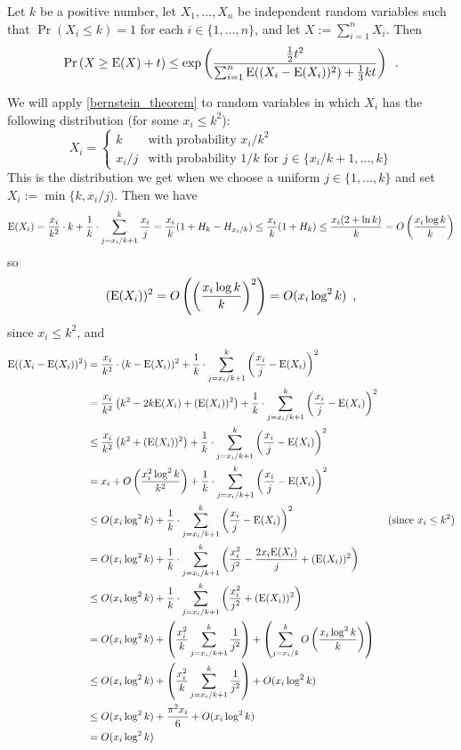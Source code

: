 \documentclass{patmorin}
\begin{document}
\begin{thm}\label{bernstein_theorem}
  Let $k$ be a positive number, let $X_1,\ldots,X_n$ be independent random variables such that $\Pr(X_i\le k)=1$ for each $i\in\{1,\ldots,n\}$, and let $X:=\sum_{i=1}^n X_i$. Then
  \begin{equation}
    \Pr\left(X \ge \mathrm{E}(X)+ t\right)
      \le \exp\left(\frac{\tfrac{1}{2}t^2}{\sum_{i=1}^n \mathrm{E}((X_i-\mathrm{E}(X_i))^2)+\tfrac{1}{3}kt}\right) \enspace . \label{bernstein}
  \end{equation}
\end{thm}
We will apply \cref{bernstein_theorem} to random variables in which $X_i$ has the following distribution (for some $x_i\le k^2$):
\[
  X_i = \begin{cases}
          k & \text{with probability $x_i/k^2$} \\
          x_i/j & \text{with probability $1/k$ for $j\in\{x_i/k+1,\ldots,k\}$}
        \end{cases}
\]
This is the distribution we get when we choose a uniform $j\in\{1,\ldots,k\}$ and set $X_i:=\min\{k,x_i/j)$.
Then we have
\[
  \mathrm{E}(X_i)=\frac{x_i}{k^2}\cdot k + \frac{1}{k}\cdot\sum_{j=x_i/k+1}^k \frac{x_i}{j}
  = \frac{x_i}{k}(1+H_{k}-H_{x_i/k})
  \le \frac{x_i}{k}(1+H_{k})
  \le \frac{x_i(2+\ln k)}{k}
  = O\left(\frac{x_i\log k}{k}\right)
\]
so
\[
  (\mathrm{E}(X_i))^2 = O\left(\left(\frac{x_i\log k}{k}\right)^2\right) = O(x_i\log^2 k) \enspace ,
\]
since $x_i\le k^2$,
and
\begin{align*}
  \mathrm{E}((X_i-\mathrm{E}(X_i))^2)
  & = \frac{x_i}{k^2}\cdot(k-\mathrm{E}(X_i))^2
    + \frac{1}{k}\cdot\sum_{j=x_i/k+1}^k \left(\frac{x_i}{j}-\mathrm{E}(X_i)\right)^2 \\
  & = \frac{x_i}{k^2}\left(k^2-2k\mathrm{E}(X_i)+(\mathrm{E}(X_i))^2\right)
    + \frac{1}{k}\cdot \sum_{j=x_i/k+1}^k \left(\frac{x_i}{j}-\mathrm{E}(X_i)\right)^2 \\
  & \le \frac{x_i}{k^2}\left(k^2 + (\mathrm{E}(X_i))^2\right)
    + \frac{1}{k}\cdot \sum_{j=x_i/k+1}^k \left(\frac{x_i}{j}-\mathrm{E}(X_i)\right)^2 \\
  & = x_i + O\left(\frac{x_i^2\log^2 k}{k^2}\right)
      + \frac{1}{k}\cdot\sum_{j=x_i/k+1}^k \left(\frac{x_i}{j}-\mathrm{E}(X_i)\right)^2 \\
  & \le O(x_i\log^2 k)
      + \frac{1}{k}\cdot\sum_{j=x_i/k+1}^k \left(\frac{x_i}{j}-\mathrm{E}(X_i)\right)^2
      & \text{(since $x_i\le k^2$)} \\
 & = O(x_i\log^2 k) + \frac{1}{k}\cdot\sum_{j=x_i/k+1}^k \left(\frac{x_i^2}{j^2}-\frac{2x_i \mathrm{E}(X_i)}{j} + (\mathrm{E}(X_i))^2\right) \\
 & \le O(x_i\log^2 k) + \frac{1}{k}\cdot\sum_{j=x_i/k+1}^k \left(\frac{x_i^2}{j^2} + (\mathrm{E}(X_i))^2\right) \\
 & = O(x_i\log^2 k) +  \left(\frac{x_i^2}{k}\sum_{j=x_i/k+1}^k\frac{1}{j^2}\right)
   + \left(\sum_{j=x_i/k}^k O\left(\frac{x_i\log^2 k}{k}\right)\right) \\
 & \le O(x_i\log^2 k) + \left(\frac{x_i^2}{k}\sum_{j=x_i/k+1}^k\frac{1}{j^2}\right)
    + O(x_i\log^2 k)\\
  & \le O(x_i\log^2 k) + \frac{\pi^2 x_i}{6} + O(x_i\log^2 k) \\
  & = O(x_i\log^2 k)
\end{align*}
\end{document}
